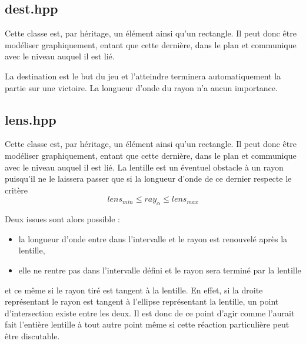 \documentclass[a4paper,11pt]{report}
\begin{document}
\subsection[Destination]{dest.hpp}
Cette classe est, par héritage, un élément ainsi qu'un rectangle. Il peut donc
être modéliser graphiquement, entant que cette dernière, dans le plan et
communique avec le niveau auquel il est lié. 

La destination est le but du jeu et l'atteindre terminera automatiquement la 
partie sur une victoire. La longueur d'onde du rayon n'a aucun importance.
\subsection[Lentille]{lens.hpp}
\begin{center}
\end{center}
Cette classe est, par héritage, un élément ainsi qu'un rectangle. Il peut donc
être modéliser graphiquement, entant que cette dernière, dans le plan et
communique avec le niveau auquel il est lié. La lentille est un éventuel
obstacle à un rayon puisqu'il ne le laissera passer que si la longueur d'onde de
ce dernier respecte le critère
$$lens_{min} \leq ray_{\alpha} \leq lens_{max}$$

Deux issues sont alors possible :
\begin{itemize}
	\item la longueur d'onde entre dans l'intervalle et le rayon est renouvelé
		après la lentille,
	\item elle ne rentre pas dans l'intervalle défini et le rayon sera terminé par
		la lentille
\end{itemize}
et ce même si le rayon tiré est tangent à la lentille. En effet, si la droite
représentant le rayon est tangent à l'ellipse représentant la lentille,
un point d'intersection existe entre les deux. Il est donc de ce point d'agir
comme l'aurait fait l'entière lentille à tout autre point même si cette
réaction particulière peut être discutable. 
\end{document}
